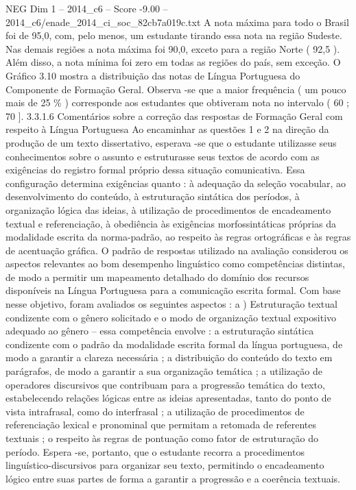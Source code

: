 \begin{textsample}{NEG Dim 1 – 2014\_c6 – Score -9.00 – 2014\_c6/enade\_2014\_ci\_soc\_82cb7a019c.txt}
A nota máxima para todo o Brasil foi de 95,0, com, pelo menos, um estudante tirando essa nota na região Sudeste.
Nas demais regiões a nota máxima foi 90,0, exceto para a região Norte ( 92,5 ).
Além disso, a nota mínima foi zero em todas as regiões do país, sem exceção.
O Gráfico 3.10 mostra a distribuição das notas de Língua Portuguesa do Componente de Formação Geral.
Observa -se que a maior frequência ( um pouco mais de 25 \% ) corresponde aos estudantes que obtiveram nota no intervalo ( 60 ; 70 ]. 3.3.1.6 Comentários sobre a correção das respostas de Formação Geral com respeito à Língua Portuguesa Ao encaminhar as questões 1 e 2 na direção da produção de um texto dissertativo, esperava -se que o estudante utilizasse seus conhecimentos sobre o assunto e estruturasse seus textos de acordo com as exigências do registro formal próprio dessa situação comunicativa.
Essa configuração determina exigências quanto : à adequação da seleção vocabular, ao desenvolvimento do conteúdo, à estruturação sintática dos períodos, à organização lógica das ideias, à utilização de procedimentos de encadeamento textual e referenciação, à obediência às exigências morfossintáticas próprias da modalidade escrita da norma-padrão, ao respeito às regras ortográficas e às regras de acentuação gráfica.
O padrão de respostas utilizado na avaliação considerou os aspectos relevantes ao bom desempenho linguístico como competências distintas, de modo a permitir um mapeamento detalhado do domínio dos recursos disponíveis na Língua Portuguesa para a comunicação escrita formal.
Com base nesse objetivo, foram avaliados os seguintes aspectos : a ) Estruturação textual condizente com o gênero solicitado e o modo de organização textual expositivo adequado ao gênero – essa competência envolve : a estruturação sintática condizente com o padrão da modalidade escrita formal da língua portuguesa, de modo a garantir a clareza necessária ; a distribuição do conteúdo do texto em parágrafos, de modo a garantir a sua organização temática ; a utilização de operadores discursivos que contribuam para a progressão temática do texto, estabelecendo relações lógicas entre as ideias apresentadas, tanto do ponto de vista intrafrasal, como do interfrasal ; a utilização de procedimentos de referenciação lexical e pronominal que permitam a retomada de referentes textuais ; o respeito às regras de pontuação como fator de estruturação do período.
Espera -se, portanto, que o estudante recorra a procedimentos linguístico-discursivos para organizar seu texto, permitindo o encadeamento lógico entre suas partes de forma a garantir a progressão e a coerência textuais.

\end{textsample}
